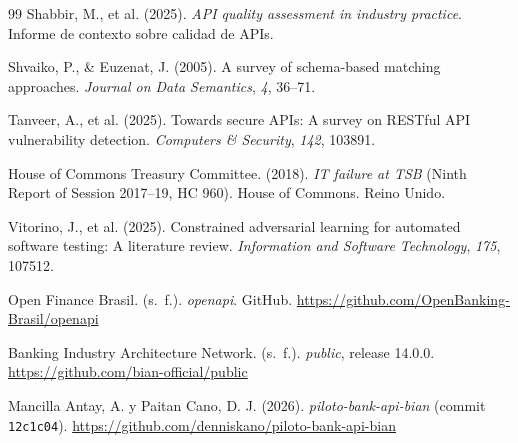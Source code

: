 \begin{thebibliography}{99}
Shabbir, M., et al. (2025).
\textit{API quality assessment in industry practice}.
Informe de contexto sobre calidad de APIs.

Shvaiko, P., \& Euzenat, J. (2005).
A survey of schema-based matching approaches.
\textit{Journal on Data Semantics}, \textit{4}, 36--71.

Tanveer, A., et al. (2025).
Towards secure APIs: A survey on RESTful API vulnerability detection.
\textit{Computers \& Security}, \textit{142}, 103891.

House of Commons Treasury Committee. (2018).
\textit{IT failure at TSB} (Ninth Report of Session 2017--19, HC 960).
House of Commons. Reino Unido.

Vitorino, J., et al. (2025).
Constrained adversarial learning for automated software testing: A literature review.
\textit{Information and Software Technology}, \textit{175}, 107512.

Open Finance Brasil. (s.\ f.). \textit{openapi}. GitHub.
\url{https://github.com/OpenBanking-Brasil/openapi}

Banking Industry Architecture Network. (s.\ f.). \textit{public}, release 14.0.0.
\url{https://github.com/bian-official/public}

Mancilla Antay, A. y Paitan Cano, D. J. (2026). \textit{piloto-bank-api-bian} (commit \texttt{12c1c04}).
\url{https://github.com/denniskano/piloto-bank-api-bian}

\end{thebibliography}
